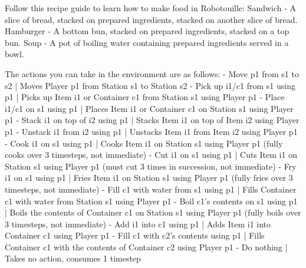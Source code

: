 Follow this recipe guide to learn how to make food in Robotouille:
    Sandwich - A slice of bread, stacked on prepared ingredients, stacked on another slice of bread.
    Hamburger - A bottom bun, stacked on prepared ingredients, stacked on a top bun.
    Soup - A pot of boiling water containing prepared ingredients served in a bowl.

The actions you can take in the environment are as follows:
    - Move {p1} from {s1} to {s2} | Moves Player {p1} from Station {s1} to Station {s2}
    - Pick up {i1/c1} from {s1} using {p1} | Picks up Item {i1} or Container {c1} from Station {s1} using Player {p1}
    - Place {i1/c1} on {s1} using {p1} | Places Item {i1} or Container {c1} on Station {s1} using Player {p1}
    - Stack {i1} on top of {i2} using {p1} | Stacks Item {i1} on top of Item {i2} using Player {p1}
    - Unstack {i1} from {i2} using {p1} | Unstacks Item {i1} from Item {i2} using Player {p1}
    - Cook {i1} on {s1} using {p1} | Cooks Item {i1} on Station {s1} using Player {p1} (fully cooks over 3 timesteps, not immediate)
    - Cut {i1} on {s1} using {p1} | Cuts Item {i1} on Station {s1} using Player {p1} (must cut 3 times in succession, not immediate)
    - Fry {i1} on {s1} using {p1} | Fries Item {i1} on Station {s1} using Player {p1} (fully fries over 3 timesteps, not immediate)
    - Fill {c1} with water from {s1} using {p1} | Fills Container {c1} with water from Station {s1} using Player {p1}
    - Boil {c1}'s contents on {s1} using {p1} | Boils the contents of Container {c1} on Station {s1} using Player {p1} (fully boils over 3 timesteps, not immediate)
    - Add {i1} into {c1} using {p1} | Adds Item {i1} into Container {c1} using Player {p1}
    - Fill {c1} with {c2}'s contents using {p1} | Fills Container {c1} with the contents of Container {c2} using Player {p1}
    - Do nothing | Takes no action, consumes 1 timestep